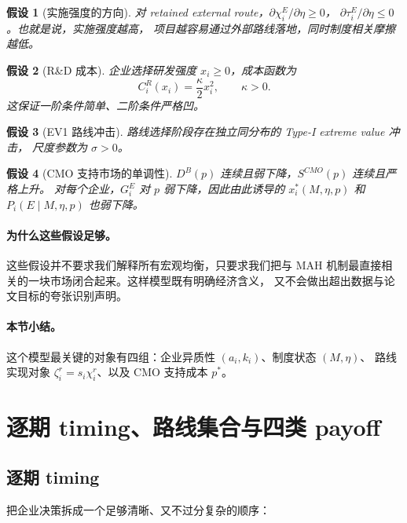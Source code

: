 \documentclass[12pt,UTF8]{ctexart}
\theoremstyle{plain}
\newtheorem{assumption}{假设}[section]
\theoremstyle{remark}
\begin{document}
\begin{assumption}[实施强度的方向]
对 retained external route，$\partial \chi_i^E/\partial \eta\ge 0$，
$\partial \tau_i^E/\partial \eta\le 0$。也就是说，实施强度越高，
项目越容易通过外部路线落地，同时制度相关摩擦越低。
\end{assumption}

\begin{assumption}[R\&D 成本]
企业选择研发强度 $x_i\ge 0$，成本函数为
\[
C_i^R(x_i)=\frac{\kappa}{2}x_i^2,\qquad \kappa>0.
\]
这保证一阶条件简单、二阶条件严格凹。
\end{assumption}

\begin{assumption}[EV1 路线冲击]
路线选择阶段存在独立同分布的 Type-I extreme value 冲击，
尺度参数为 $\sigma>0$。
\end{assumption}

\begin{assumption}[CMO 支持市场的单调性]
$D^B(p)$ 连续且弱下降，$S^{CMO}(p)$ 连续且严格上升。
对每个企业，$G_i^E$ 对 $p$ 弱下降，因此由此诱导的
$x_i^*(M,\eta,p)$ 和 $P_i(E\mid M,\eta,p)$ 也弱下降。
\end{assumption}

\paragraph{为什么这些假设足够。}
这些假设并不要求我们解释所有宏观均衡，只要求我们把与 MAH
机制最直接相关的一块市场闭合起来。这样模型既有明确经济含义，
又不会做出超出数据与论文目标的夸张识别声明。

\paragraph{本节小结。}
这个模型最关键的对象有四组：企业异质性 $(a_i,k_i)$、制度状态 $(M,\eta)$、
路线实现对象 $\zeta_i^r=s_i\chi_i^r$、以及 CMO 支持成本 $p^*$。

\section{逐期 timing、路线集合与四类 payoff}

\subsection{逐期 timing}

把企业决策拆成一个足够清晰、又不过分复杂的顺序：
\end{document}
